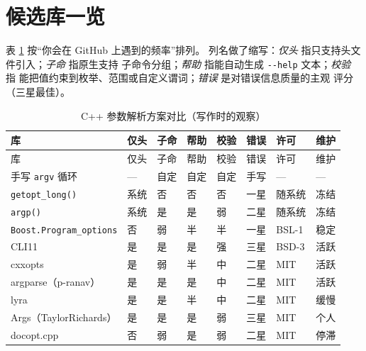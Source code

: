 \documentclass[12pt,a4paper,fontset=fandol]{ctexbook}
\newcommand{\Fn}[1]{\texttt{#1()}}
\newcommand{\Tp}[1]{\texttt{#1}}
\newcommand{\Opt}[1]{\texttt{-\/-#1}}
\newcommand{\Bk}{\allowbreak}
\begin{document}
\section{候选库一览}

表 \ref{tab:clilibs} 按``你会在 GitHub 上遇到的频率''排列。
列名做了缩写：\emph{仅头} 指只支持头文件引入；\emph{子命} 指原生支持
子命令分组；\emph{帮助} 指能自动生成 \Opt{help} 文本；\emph{校验} 指
能把值约束到枚举、范围或自定义谓词；\emph{错误} 是对错误信息质量的主观
评分（三星最佳）。

\begin{longtable}{@{}>{\raggedright\arraybackslash}p{}
                 >{\raggedright\arraybackslash}p{}
                 >{\raggedright\arraybackslash}p{}
                 >{\raggedright\arraybackslash}p{}
                 >{\raggedright\arraybackslash}p{}
                 >{\raggedright\arraybackslash}p{}
                 >{\raggedright\arraybackslash}p{}
                 >{\raggedright\arraybackslash}p{}@{}}
\caption{C++ 参数解析方案对比（写作时的观察）}
\label{tab:clilibs} \\
\toprule
库 & 仅头 & 子命 & 帮助 & 校验 & 错误 & 许可 & 维护 \\
\midrule
\endfirsthead
\toprule
库 & 仅头 & 子命 & 帮助 & 校验 & 错误 & 许可 & 维护 \\
\midrule
\endhead
手写 \Tp{argv} 循环 & --- & 自定 & 自定 & 自定 & 手写 & --- & --- \\
\Fn{getopt\Bk\_long} & 系统 & 否 & 否 & 否 & 一星 & 随系统 & 冻结 \\
\Fn{argp} & 系统 & 是 & 是 & 弱 & 二星 & 随系统 & 冻结 \\
\Tp{Boost\Bk.Program\Bk\_options} & 否 & 弱 & 半 & 半 & 一星 & BSL-1 & 稳定 \\
CLI11 & 是 & 是 & 是 & 强 & 三星 & BSD-3 & 活跃 \\
cxxopts & 是 & 弱 & 半 & 中 & 二星 & MIT & 活跃 \\
argparse（p-ranav） & 是 & 是 & 是 & 中 & 二星 & MIT & 活跃 \\
lyra & 是 & 是 & 半 & 中 & 二星 & MIT & 缓慢 \\
Args（Taylor\Bk Richards） & 是 & 是 & 是 & 弱 & 三星 & MIT & 个人 \\
docopt.cpp & 否 & 弱 & 是 & 弱 & 二星 & MIT & 停滞 \\
\bottomrule
\end{longtable}
\end{document}
